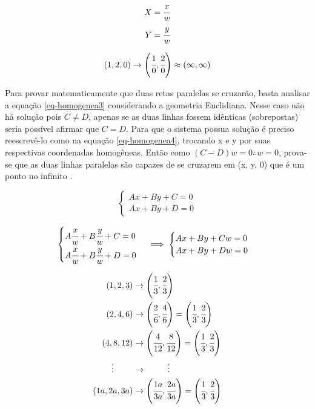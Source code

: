 \begin{equation} \label{eq-homogenea}
	\begin{aligned}
	X = \cfrac{x}{w} \\
	Y = \cfrac{y}{w} 
	\end{aligned}
\end{equation}

\begin{equation} \label{eq-homogenea2}
	\begin{aligned}
		(1,2,0) \rightarrow \left(\cfrac{1}{0}, \cfrac{2}{0}\right) \approx (\infty,\infty)
	\end{aligned}
\end{equation}

Para provar matematicamente que duas retas paralelas se cruzarão, basta analisar a equação \ref{eq-homogenea3} considerando a geometria Euclidiana. Nesse caso não há solução pois $ C \neq D $, apenas se as duas linhas fossem idênticas (sobrepostas) seria possível afirmar que $ C = D $. Para que o sistema possua solução é preciso reescrevê-lo como na equação \ref{eq-homogenea4}, trocando x e y por suas respectivas coordenadas homogêneas. Então como $ (C-D)w = 0 \therefore w=0 $, prova-se que as duas linhas paralelas são capazes de se cruzarem em (x, y, 0) que é um ponto no infinito \cite{homogenous}.

\begin{equation} \label{eq-homogenea3}
	\begin{cases}
	Ax + By + C = 0 \\
	Ax + By + D = 0
	\end{cases}
\end{equation}

\begin{equation} \label{eq-homogenea4}
	\begin{cases}
	A\cfrac{x}{w} + B\cfrac{y}{w} + C = 0 \\
	A\cfrac{x}{w} + B\cfrac{y}{w} + D = 0
	\end{cases}
	\implies
	\begin{cases}
		Ax + By + Cw = 0 \\
		Ax + By + Dw = 0
	\end{cases}
\end{equation}

\begin{equation} \label{eq-homogenea5}
	\begin{split}
	(1,2,3) & \rightarrow \left(\cfrac{1}{3},\cfrac{2}{3}\right) \\
	(2,4,6) & \rightarrow \left(\cfrac{2}{6},\cfrac{4}{6}\right) = \left(\cfrac{1}{3},\cfrac{2}{3}\right) \\
	(4,8,12) & \rightarrow \left(\cfrac{4}{12},\cfrac{8}{12}\right) = \left(\cfrac{1}{3},\cfrac{2}{3}\right) \\
	\vdots \hspace{.8cm} & \rightarrow \hspace{.9cm} \vdots \\
	(1a,2a,3a) & \rightarrow \left(\cfrac{1a}{3a},\cfrac{2a}{3a}\right) = \left(\cfrac{1}{3},\cfrac{2}{3}\right)
	\end{split}
\end{equation}
